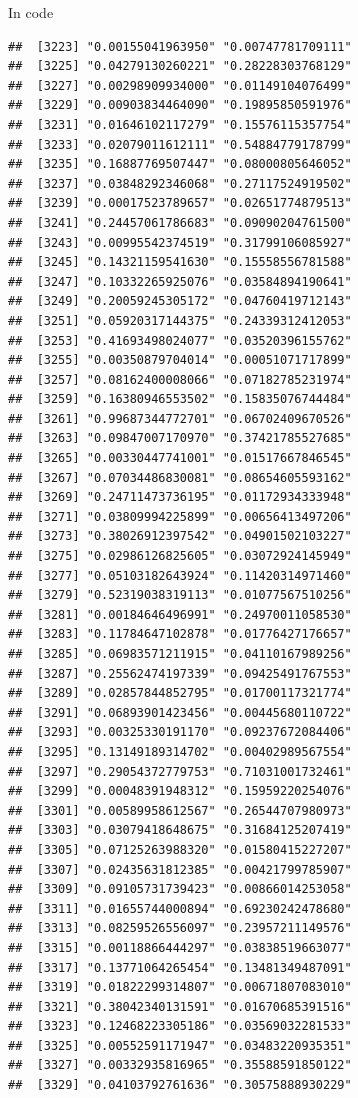 \documentclass[ignorenonframetext,]{beamer}
\begin{document}
\begin{frame}[fragile]{In code}
\begin{verbatim}
##  [3223] "0.00155041963950" "0.00747781709111"
##  [3225] "0.04279130260221" "0.28228303768129"
##  [3227] "0.00298909934000" "0.01149104076499"
##  [3229] "0.00903834464090" "0.19895850591976"
##  [3231] "0.01646102117279" "0.15576115357754"
##  [3233] "0.02079011612111" "0.54884779178799"
##  [3235] "0.16887769507447" "0.08000805646052"
##  [3237] "0.03848292346068" "0.27117524919502"
##  [3239] "0.00017523789657" "0.02651774879513"
##  [3241] "0.24457061786683" "0.09090204761500"
##  [3243] "0.00995542374519" "0.31799106085927"
##  [3245] "0.14321159541630" "0.15558556781588"
##  [3247] "0.10332265925076" "0.03584894190641"
##  [3249] "0.20059245305172" "0.04760419712143"
##  [3251] "0.05920317144375" "0.24339312412053"
##  [3253] "0.41693498024077" "0.03520396155762"
##  [3255] "0.00350879704014" "0.00051071717899"
##  [3257] "0.08162400008066" "0.07182785231974"
##  [3259] "0.16380946553502" "0.15835076744484"
##  [3261] "0.99687344772701" "0.06702409670526"
##  [3263] "0.09847007170970" "0.37421785527685"
##  [3265] "0.00330447741001" "0.01517667846545"
##  [3267] "0.07034486830081" "0.08654605593162"
##  [3269] "0.24711473736195" "0.01172934333948"
##  [3271] "0.03809994225899" "0.00656413497206"
##  [3273] "0.38026912397542" "0.04901502103227"
##  [3275] "0.02986126825605" "0.03072924145949"
##  [3277] "0.05103182643924" "0.11420314971460"
##  [3279] "0.52319038319113" "0.01077567510256"
##  [3281] "0.00184646496991" "0.24970011058530"
##  [3283] "0.11784647102878" "0.01776427176657"
##  [3285] "0.06983571211915" "0.04110167989256"
##  [3287] "0.25562474197339" "0.09425491767553"
##  [3289] "0.02857844852795" "0.01700117321774"
##  [3291] "0.06893901423456" "0.00445680110722"
##  [3293] "0.00325330191170" "0.09237672084406"
##  [3295] "0.13149189314702" "0.00402989567554"
##  [3297] "0.29054372779753" "0.71031001732461"
##  [3299] "0.00048391948312" "0.15959220254076"
##  [3301] "0.00589958612567" "0.26544707980973"
##  [3303] "0.03079418648675" "0.31684125207419"
##  [3305] "0.07125263988320" "0.01580415227207"
##  [3307] "0.02435631812385" "0.00421799785907"
##  [3309] "0.09105731739423" "0.00866014253058"
##  [3311] "0.01655744000894" "0.69230242478680"
##  [3313] "0.08259526556097" "0.23957211149576"
##  [3315] "0.00118866444297" "0.03838519663077"
##  [3317] "0.13771064265454" "0.13481349487091"
##  [3319] "0.01822299314807" "0.00671807083010"
##  [3321] "0.38042340131591" "0.01670685391516"
##  [3323] "0.12468223305186" "0.03569032281533"
##  [3325] "0.00552591171947" "0.03483220935351"
##  [3327] "0.00332935816965" "0.35588591850122"
##  [3329] "0.04103792761636" "0.30575888930229"

\end{verbatim}
\end{frame}
\end{document}
